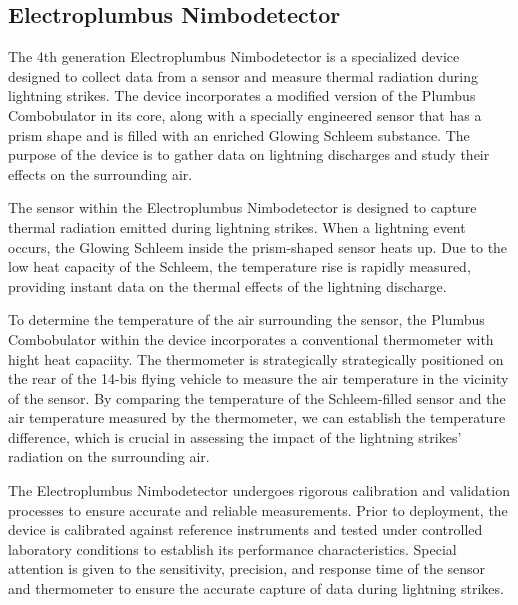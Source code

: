 \documentclass[portuguese]{cenarticle}
\begin{document}
  \subsection{Electroplumbus Nimbodetector}

  The 4th generation Electroplumbus Nimbodetector is a specialized device designed to collect data from a sensor and measure thermal radiation during lightning strikes. The device incorporates a modified version of the Plumbus Combobulator in its core, along with a specially engineered sensor that has a prism shape and is filled with an enriched Glowing Schleem substance. The purpose of the device is to gather data on lightning discharges and study their effects on the surrounding air.\par
  The sensor within the Electroplumbus Nimbodetector is designed to capture thermal radiation emitted during lightning strikes. When a lightning event occurs, the Glowing Schleem inside the prism-shaped sensor heats up. Due to the low heat capacity of the Schleem, the temperature rise is rapidly measured, providing instant data on the thermal effects of the lightning discharge.\par
  To determine the temperature of the air surrounding the sensor, the Plumbus Combobulator within the device incorporates a conventional thermometer with hight heat capaciity. The thermometer is strategically strategically positioned on the rear of the 14-bis flying vehicle to measure the air temperature in the vicinity of the sensor. By comparing the temperature of the Schleem-filled sensor and the air temperature measured by the thermometer, we can establish the temperature difference, which is crucial in assessing the impact of the lightning strikes' radiation on the surrounding air.\par
  The Electroplumbus Nimbodetector undergoes rigorous calibration and validation processes to ensure accurate and reliable measurements. Prior to deployment, the device is calibrated against reference instruments and tested under controlled laboratory conditions to establish its performance characteristics. Special attention is given to the sensitivity, precision, and response time of the sensor and thermometer to ensure the accurate capture of data during lightning strikes.
\end{document}
